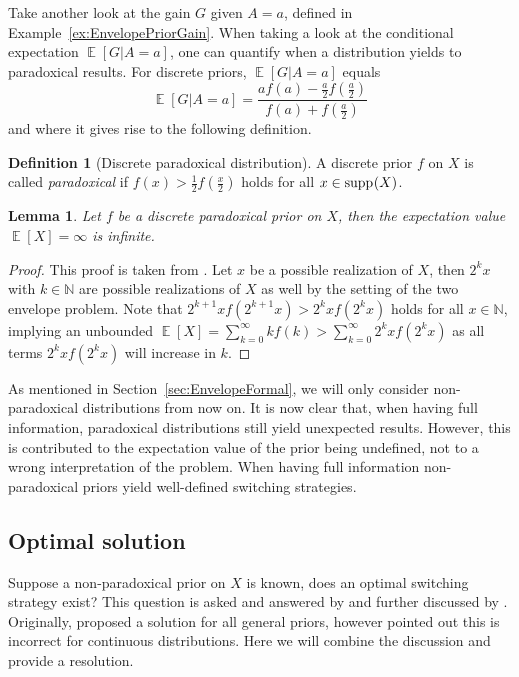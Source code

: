 \documentclass[a4paper]{report}
\theoremstyle{plain}
\newtheorem{lemma}[theorem]{Lemma}
\theoremstyle{definition}
\newtheorem{definition}[theorem]{Definition}
\theoremstyle{remark}
\numberwithin{equation}{chapter}
\newcommand{\N}{\mathbb{N}}
\let\P\relax
\DeclareMathOperator{\P}{\mathbb{P}}
\DeclareMathOperator{\E}{\mathbb{E}}
\DeclareMathOperator{\1}{\mathbbm{1}}
\DeclareMathOperator{\supp}{supp}
\begin{document}
Take another look at the gain $G$ given $A=a$, defined in Example~\ref{ex:EnvelopePriorGain}. When taking a look at the conditional expectation $\E[G|A=a]$, one can quantify when a distribution yields to paradoxical results. For discrete priors, $\E[G|A=a]$ equals \cite{Navara17,Tzur18}
\begin{equation}
\E[G|A=a]=\frac{af(a)-\frac{a}{2}f\left(\frac{a}{2}\right)}{f(a)+f\left(\frac{a}{2}\right)}
\end{equation}
and where it gives rise to the following definition.
\begin{definition}[Discrete paradoxical distribution]
A discrete prior $f$ on $X$ is called \emph{paradoxical} if $f(x)>\frac{1}{2}f\left(\frac{x}{2}\right)$ holds for all $x\in\supp_{\P}(X)$.
\end{definition}
\begin{lemma}
Let $f$ be a discrete paradoxical prior on $X$, then the expectation value $\E[X]=\infty$ is infinite.
\end{lemma}
\begin{proof}
This proof is taken from \cite{Tzur18}. Let $x$ be a possible realization of $X$, then $2^k x$ with $k\in\N$ are possible realizations of $X$ as well by the setting of the two envelope problem. Note that $2^{k+1}xf(2^{k+1} x)>2^k xf(2^kx)$ holds for all $x\in\N$, implying an unbounded $\E[X]=\sum_{k=0}^\infty k f(k)>\sum_{k=0}^\infty 2^k xf(2^k x)$ as all terms $2^kxf(2^kx)$ will increase in $k$.
\end{proof}

As mentioned in Section~\ref{sec:EnvelopeFormal}, we will only consider non-paradoxical distributions from now on. It is now clear that, when having full information, paradoxical distributions still yield unexpected results. However, this is contributed to the expectation value of the prior being undefined, not to a wrong interpretation of the problem. When having full information non-paradoxical priors yield well-defined switching strategies.


\subsection{Optimal solution}
Suppose a non-paradoxical prior on $X$ is known, does an optimal switching strategy exist? This question is asked and answered by \cite{Christensen92} and further discussed by \cite{Christensen93a,Christensen93b,Christensen94,Christensen96}. Originally, \cite{Christensen92} proposed a solution for all general priors, however \cite{Christensen96} pointed out this is incorrect for continuous distributions. Here we will combine the discussion and provide a resolution.
\end{document}
